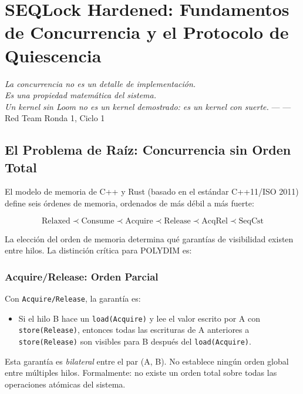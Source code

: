 \chapter{SEQLock Hardened: Fundamentos de Concurrencia y el Protocolo de Quiescencia}


\textit{La concurrencia no es un detalle de implementación.\\
Es una propiedad matemática del sistema.\\ 
Un kernel sin Loom no es un kernel demostrado:
es un kernel con suerte.} --- --- Red Team Ronda 1, Ciclo 1

\section{El Problema de Raíz: Concurrencia sin Orden Total}

El modelo de memoria de C++ y Rust (basado en el estándar C++11/ISO 2011)
define seis órdenes de memoria, ordenados de más débil a más fuerte:

\begin{equation}
\text{Relaxed} \prec \text{Consume} \prec \text{Acquire} \prec \text{Release} \prec \text{AcqRel} \prec \text{SeqCst}
\end{equation}

La elección del orden de memoria determina qué garantías de visibilidad existen
entre hilos. La distinción crítica para POLYDIM es:

\subsection{Acquire/Release: Orden Parcial}

Con \texttt{Acquire/Release}, la garantía es:
\begin{itemize}
\item Si el hilo B hace un \texttt{load(Acquire)} y lee el valor escrito por A con
\texttt{store(Release)}, entonces todas las escrituras de A anteriores a \texttt{store(Release)}
son visibles para B después del \texttt{load(Acquire)}.
\end{itemize}

Esta garantía es \textit{bilateral} entre el par (A, B). No establece ningún orden
global entre múltiples hilos. Formalmente: no existe un orden total sobre todas las
operaciones atómicas del sistema.


